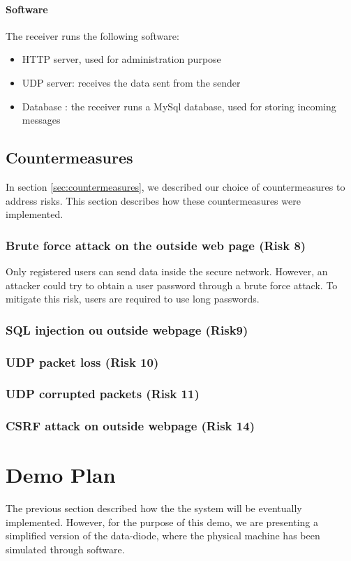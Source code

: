 \documentclass[a4paper,11pt]{article}
\begin{document}
\paragraph{Software}
The receiver runs the following software:
\begin{itemize}
	\item{HTTP server, used for administration purpose}
	\item{UDP server: receives the data sent from the sender}
	\item{Database : the receiver runs a MySql database, used for storing incoming messages}
\end{itemize}

\subsection{Countermeasures}
In section \ref{sec:countermeasures}, we described our choice of countermeasures to address risks. This section describes how these countermeasures were implemented.

\subsubsection{Brute force attack on the outside web page (Risk 8)}
Only registered users can send data inside the secure network. However, an attacker could try to obtain a user password through a brute force attack. To mitigate this risk, users are required to use long passwords.

\subsubsection{SQL injection ou outside webpage (Risk9)}

\subsubsection{UDP packet loss (Risk 10)}

\subsubsection{UDP corrupted packets (Risk 11)}

\subsubsection{CSRF attack on outside webpage (Risk 14)}


\section{Demo Plan}
The previous section described how the the system will be eventually implemented. However, for the purpose of this demo, we are presenting a simplified version of the data-diode, where the physical machine has been simulated through software.\\
\end{document}
